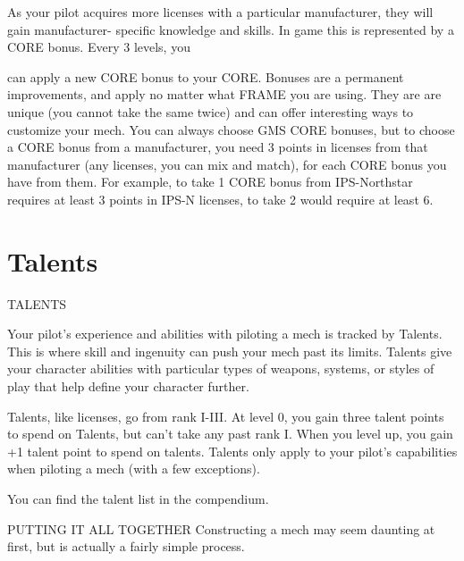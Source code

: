 As your pilot acquires more licenses with a particular manufacturer, they will gain manufacturer-
specific knowledge and skills. In game this is represented by a CORE bonus. Every 3 levels, you




can apply a new CORE bonus to your CORE. Bonuses are a permanent improvements, and
apply no matter what FRAME you are using. They are are unique (you cannot take the same
twice) and can offer interesting ways to customize your mech. You can always choose GMS
CORE bonuses, but to choose a CORE bonus from a manufacturer, you need 3 points in licenses
from that manufacturer (any licenses, you can mix and match), for each CORE bonus you have
from them. For example, to take 1 CORE bonus from IPS-Northstar requires at least 3 points in
IPS-N licenses, to take 2 would require at least 6.

\section{Talents}
                                                 TALENTS

Your pilot’s experience and abilities with piloting a mech is tracked by Talents. This is where skill
and ingenuity can push your mech past its limits. Talents give your character abilities with
particular types of weapons, systems, or styles of play that help define your character further.


Talents, like licenses, go from rank I-III. At level 0, you gain three talent points to spend on
Talents, but can’t take any past rank I. When you level up, you gain +1 talent point to spend on
talents. Talents only apply to your pilot’s capabilities when piloting a mech (with a few
exceptions).


You can find the talent list in the compendium.


                                   PUTTING IT ALL TOGETHER
Constructing a mech may seem daunting at first, but is actually a fairly simple process.

